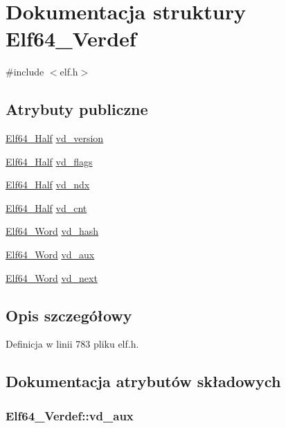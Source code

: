 \hypertarget{struct_elf64___verdef}{\section{Dokumentacja struktury Elf64\-\_\-\-Verdef}
\label{struct_elf64___verdef}
}


{\ttfamily \#include $<$elf.\-h$>$}

\subsection*{Atrybuty publiczne}
\begin{DoxyCompactItemize}
\item 
\hyperlink{elf_8h_adb6a5584018b431da3472e7c6a7fd731}{Elf64\-\_\-\-Half} \hyperlink{struct_elf64___verdef_afe15c8d72df394443deb40da61df3459}{vd\-\_\-version}
\item 
\hyperlink{elf_8h_adb6a5584018b431da3472e7c6a7fd731}{Elf64\-\_\-\-Half} \hyperlink{struct_elf64___verdef_a1d69114c03f683d4b6b6f3a83c7021f1}{vd\-\_\-flags}
\item 
\hyperlink{elf_8h_adb6a5584018b431da3472e7c6a7fd731}{Elf64\-\_\-\-Half} \hyperlink{struct_elf64___verdef_a069835dc20ac41af0ac611eefbe5169a}{vd\-\_\-ndx}
\item 
\hyperlink{elf_8h_adb6a5584018b431da3472e7c6a7fd731}{Elf64\-\_\-\-Half} \hyperlink{struct_elf64___verdef_ac41468980738fcc6b1b15ccda97a19a8}{vd\-\_\-cnt}
\item 
\hyperlink{elf_8h_aa3aa1920ed115b7ef7e99716fece4401}{Elf64\-\_\-\-Word} \hyperlink{struct_elf64___verdef_afb01f82af6211a4a0dfc314c3b3a43b2}{vd\-\_\-hash}
\item 
\hyperlink{elf_8h_aa3aa1920ed115b7ef7e99716fece4401}{Elf64\-\_\-\-Word} \hyperlink{struct_elf64___verdef_ae59893f742edf4e58e2acd78a1168aa3}{vd\-\_\-aux}
\item 
\hyperlink{elf_8h_aa3aa1920ed115b7ef7e99716fece4401}{Elf64\-\_\-\-Word} \hyperlink{struct_elf64___verdef_a9cebd5131a542990d3130489a3b4acec}{vd\-\_\-next}
\end{DoxyCompactItemize}


\subsection{Opis szczegółowy}


Definicja w linii 783 pliku elf.\-h.



\subsection{Dokumentacja atrybutów składowych}
\hypertarget{struct_elf64___verdef_ae59893f742edf4e58e2acd78a1168aa3}{
\subsubsection[{vd\-\_\-aux}]{ Elf64\-\_\-\-Verdef\-::vd\-\_\-aux}}\label{struct_elf64___verdef_ae59893f742edf4e58e2acd78a1168aa3}


